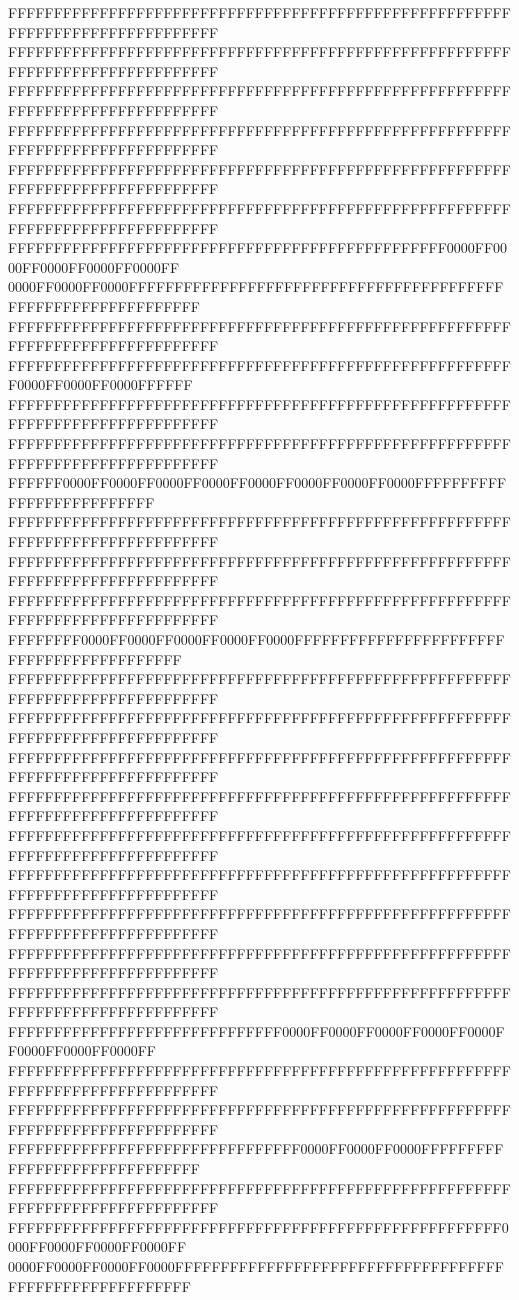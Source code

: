 FFFFFFFFFFFFFFFFFFFFFFFFFFFFFFFFFFFFFFFFFFFFFFFFFFFFFFFFFFFFFFFFFFFFFFFFFFFFFF
FFFFFFFFFFFFFFFFFFFFFFFFFFFFFFFFFFFFFFFFFFFFFFFFFFFFFFFFFFFFFFFFFFFFFFFFFFFFFF
FFFFFFFFFFFFFFFFFFFFFFFFFFFFFFFFFFFFFFFFFFFFFFFFFFFFFFFFFFFFFFFFFFFFFFFFFFFFFF
FFFFFFFFFFFFFFFFFFFFFFFFFFFFFFFFFFFFFFFFFFFFFFFFFFFFFFFFFFFFFFFFFFFFFFFFFFFFFF
FFFFFFFFFFFFFFFFFFFFFFFFFFFFFFFFFFFFFFFFFFFFFFFFFFFFFFFFFFFFFFFFFFFFFFFFFFFFFF
FFFFFFFFFFFFFFFFFFFFFFFFFFFFFFFFFFFFFFFFFFFFFFFFFFFFFFFFFFFFFFFFFFFFFFFFFFFFFF
FFFFFFFFFFFFFFFFFFFFFFFFFFFFFFFFFFFFFFFFFFFFFFFF0000FF0000FF0000FF0000FF0000FF
0000FF0000FF0000FFFFFFFFFFFFFFFFFFFFFFFFFFFFFFFFFFFFFFFFFFFFFFFFFFFFFFFFFFFFFF
FFFFFFFFFFFFFFFFFFFFFFFFFFFFFFFFFFFFFFFFFFFFFFFFFFFFFFFFFFFFFFFFFFFFFFFFFFFFFF
FFFFFFFFFFFFFFFFFFFFFFFFFFFFFFFFFFFFFFFFFFFFFFFFFFFFFFFF0000FF0000FF0000FFFFFF
FFFFFFFFFFFFFFFFFFFFFFFFFFFFFFFFFFFFFFFFFFFFFFFFFFFFFFFFFFFFFFFFFFFFFFFFFFFFFF
FFFFFFFFFFFFFFFFFFFFFFFFFFFFFFFFFFFFFFFFFFFFFFFFFFFFFFFFFFFFFFFFFFFFFFFFFFFFFF
FFFFFF0000FF0000FF0000FF0000FF0000FF0000FF0000FF0000FFFFFFFFFFFFFFFFFFFFFFFFFF
FFFFFFFFFFFFFFFFFFFFFFFFFFFFFFFFFFFFFFFFFFFFFFFFFFFFFFFFFFFFFFFFFFFFFFFFFFFFFF
FFFFFFFFFFFFFFFFFFFFFFFFFFFFFFFFFFFFFFFFFFFFFFFFFFFFFFFFFFFFFFFFFFFFFFFFFFFFFF
FFFFFFFFFFFFFFFFFFFFFFFFFFFFFFFFFFFFFFFFFFFFFFFFFFFFFFFFFFFFFFFFFFFFFFFFFFFFFF
FFFFFFFF0000FF0000FF0000FF0000FF0000FFFFFFFFFFFFFFFFFFFFFFFFFFFFFFFFFFFFFFFFFF
FFFFFFFFFFFFFFFFFFFFFFFFFFFFFFFFFFFFFFFFFFFFFFFFFFFFFFFFFFFFFFFFFFFFFFFFFFFFFF
FFFFFFFFFFFFFFFFFFFFFFFFFFFFFFFFFFFFFFFFFFFFFFFFFFFFFFFFFFFFFFFFFFFFFFFFFFFFFF
FFFFFFFFFFFFFFFFFFFFFFFFFFFFFFFFFFFFFFFFFFFFFFFFFFFFFFFFFFFFFFFFFFFFFFFFFFFFFF
FFFFFFFFFFFFFFFFFFFFFFFFFFFFFFFFFFFFFFFFFFFFFFFFFFFFFFFFFFFFFFFFFFFFFFFFFFFFFF
FFFFFFFFFFFFFFFFFFFFFFFFFFFFFFFFFFFFFFFFFFFFFFFFFFFFFFFFFFFFFFFFFFFFFFFFFFFFFF
FFFFFFFFFFFFFFFFFFFFFFFFFFFFFFFFFFFFFFFFFFFFFFFFFFFFFFFFFFFFFFFFFFFFFFFFFFFFFF
FFFFFFFFFFFFFFFFFFFFFFFFFFFFFFFFFFFFFFFFFFFFFFFFFFFFFFFFFFFFFFFFFFFFFFFFFFFFFF
FFFFFFFFFFFFFFFFFFFFFFFFFFFFFFFFFFFFFFFFFFFFFFFFFFFFFFFFFFFFFFFFFFFFFFFFFFFFFF
FFFFFFFFFFFFFFFFFFFFFFFFFFFFFFFFFFFFFFFFFFFFFFFFFFFFFFFFFFFFFFFFFFFFFFFFFFFFFF
FFFFFFFFFFFFFFFFFFFFFFFFFFFFFF0000FF0000FF0000FF0000FF0000FF0000FF0000FF0000FF
FFFFFFFFFFFFFFFFFFFFFFFFFFFFFFFFFFFFFFFFFFFFFFFFFFFFFFFFFFFFFFFFFFFFFFFFFFFFFF
FFFFFFFFFFFFFFFFFFFFFFFFFFFFFFFFFFFFFFFFFFFFFFFFFFFFFFFFFFFFFFFFFFFFFFFFFFFFFF
FFFFFFFFFFFFFFFFFFFFFFFFFFFFFFFF0000FF0000FF0000FFFFFFFFFFFFFFFFFFFFFFFFFFFFFF
FFFFFFFFFFFFFFFFFFFFFFFFFFFFFFFFFFFFFFFFFFFFFFFFFFFFFFFFFFFFFFFFFFFFFFFFFFFFFF
FFFFFFFFFFFFFFFFFFFFFFFFFFFFFFFFFFFFFFFFFFFFFFFFFFFFFF0000FF0000FF0000FF0000FF
0000FF0000FF0000FF0000FFFFFFFFFFFFFFFFFFFFFFFFFFFFFFFFFFFFFFFFFFFFFFFFFFFFFFFF
